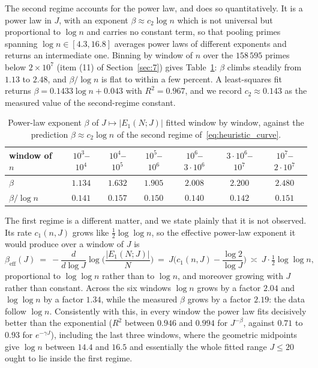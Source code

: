 \documentclass[11pt, a4paper]{article}
\theoremstyle{plain}
\theoremstyle{definition}
\begin{document}
The second regime accounts for the power law, and does so quantitatively. It is a power law in $J$, with an exponent $\beta\approx c_2\log n$ which is not universal but proportional to $\log n$ and carries no constant term, so that pooling primes spanning $\log n\in[4.3,16.8]$ averages power laws of different exponents and returns an intermediate one. Binning by window of $n$ over the $158\,595$ primes below $2\times10^{7}$ (item (11) of Section~\ref{sec:7}) gives Table~\ref{tab:binned_test}: $\beta$ climbs steadily from $1.13$ to $2.48$, and $\beta/\log n$ is flat to within a few percent. A least-squares fit returns $\beta=0.1433\log n+0.043$ with $R^{2}=0.967$, and we record $c_2\approx0.143$ as the measured value of the second-regime constant.

\begin{table}[H]
\centering
\begin{tabular}{lcccccc}
\toprule
window of $n$ & $10^{3}$--$10^{4}$ & $10^{4}$--$10^{5}$ & $10^{5}$--$10^{6}$ & $10^{6}$--$3\cdot10^{6}$ & $3\cdot10^{6}$--$10^{7}$ & $10^{7}$--$2\cdot10^{7}$\\
\midrule
$\beta$ & $1.134$ & $1.632$ & $1.905$ & $2.008$ & $2.200$ & $2.480$\\
$\beta/\log n$ & $0.141$ & $0.157$ & $0.150$ & $0.140$ & $0.142$ & $0.151$\\
\bottomrule
\end{tabular}
\caption{Power-law exponent $\beta$ of $J\mapsto|E_1(N;J)|$ fitted window by window, against the prediction $\beta\approx c_2\log n$ of the second regime of~\eqref{eq:heuristic_curve}.}
\label{tab:binned_test}
\end{table}

The first regime is a different matter, and we state plainly that it is not observed. Its rate $c_1(n,J)$ grows like $\tfrac12\log\log n$, so the effective power-law exponent it would produce over a window of $J$ is
$$\beta_{\mathrm{eff}}(J)\ =\ -\frac{d}{d\log J}\log\Big(\frac{|E_1(N;J)|}{N}\Big)\ =\ J\Big(c_1(n,J)-\frac{\log2}{\log J}\Big)\ \asymp\ J\cdot\tfrac12\log\log n,$$
proportional to $\log\log n$ rather than to $\log n$, and moreover growing with $J$ rather than constant. Across the six windows $\log n$ grows by a factor $2.04$ and $\log\log n$ by a factor $1.34$, while the measured $\beta$ grows by a factor $2.19$: the data follow $\log n$. Consistently with this, in every window the power law fits decisively better than the exponential ($R^{2}$ between $0.946$ and $0.994$ for $J^{-\beta}$, against $0.71$ to $0.93$ for $e^{-\gamma J}$), including the last three windows, where the geometric midpoints give $\log n$ between $14.4$ and $16.5$ and essentially the whole fitted range $J\le20$ ought to lie inside the first regime.
\end{document}
